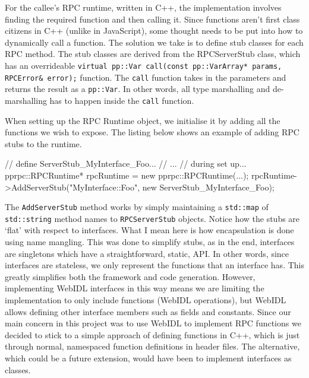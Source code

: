 \vspace{10 mm}

For the callee's RPC runtime, written in C++, the implementation involves finding the required function and then calling it. Since functions aren't first class citizens in C++ (unlike in JavaScript), some thought needs to be put into how to dynamically call a function. The solution we take is to define stub classes for each RPC method. The stub classes are derived from the RPCServerStub class, which has an overrideable \lstinline{virtual pp::Var call(const pp::VarArray* params, RPCError& error);} function. The \lstinline{call} function takes in the parameters and returns the result as a \lstinline{pp::Var}. In other words, all type marshalling and de-marshalling has to happen inside the \lstinline{call} function. 

When setting up the RPC Runtime object, we initialise it by adding all the functions we wish to expose. The listing below shows an example of adding RPC stubs to the runtime.

\begin{code}
// define ServerStub_MyInterface_Foo...
// ... 
// during set up...
pprpc::RPCRuntime* rpcRuntime = new pprpc::RPCRuntime(...);
rpcRuntime->AddServerStub("MyInterface::Foo", new ServerStub_MyInterface_Foo);

\end{code}

The \lstinline{AddServerStub} method works by simply maintaining a \lstinline{std::map} of \lstinline{std::string} method names to \lstinline{RPCServerStub} objects. Notice how the stubs are `flat' with respect to interfaces. What I mean here is how encapsulation is done using name mangling. This was done to simplify stubs, as in the end, interfaces are singletons which have a straightforward, static, API. In other words, since interfaces are stateless, we only represent the functions that an interface has. This greatly simplifies both the framework and code generation. However, implementing WebIDL interfaces in this way means we are limiting the implementation to only include functions (WebIDL operations), but WebIDL allows defining other interface members such as fields and constants. Since our main concern in this project was to use WebIDL to implement RPC functions we decided to stick to a simple approach of defining functions in C++, which is just through normal, namespaced function definitions in header files. The alternative, which could be a future extension, would have been to implement interfaces as classes. 

